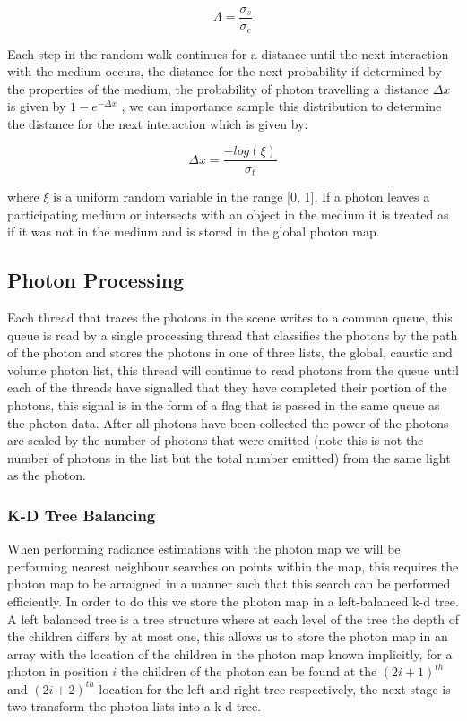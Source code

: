 \begin{equation}
\Lambda = \frac{\sigma_s}{\sigma_e}
\end{equation}

Each step in the random walk continues for a distance until the next interaction with the medium occurs, the distance for
the next probability if determined by the properties of the medium, the probability of photon travelling a distance $\Delta x$ is
given by $1 - e^{-\Delta x}$ \cite{wood-monte-carlo}, we can importance sample this distribution to determine the distance for
the next interaction \cite{JensenBook} which is given by:

\begin{equation}
\label{eq:volume_dist_importance}
\Delta x = \frac{-log(\xi)}{\sigma_t}
\end{equation}

where $\xi$ is a uniform random variable in the range [0, 1]. If a photon leaves a participating medium or intersects with an
object in the medium it is treated as if it was not in the medium and is stored in the global photon map.

\subsection{Photon Processing}
Each thread that traces the photons in the scene writes to a common queue, this queue is read by a single processing thread
that classifies the photons by the path of the photon and stores the photons in one of three lists, the global, caustic and
volume photon list, this thread will continue to read photons from the queue until each of the threads have signalled that they
have completed their portion of the photons, this signal is in the form of a flag that is passed in the same queue as the
photon data. After all photons have been collected the power of the photons are scaled by the number of photons that were
emitted (note this is not the number of photons in the list but the total number emitted) from the same light as the
photon.

\subsubsection{K-D Tree Balancing}
When performing radiance estimations with the photon map we will be performing nearest neighbour searches on points within
the map, this requires the photon map to be arraigned in a manner such that this search can be performed efficiently.
In order to do this we store the photon map in a left-balanced k-d tree. A left balanced tree is a tree structure where
at each level of the tree the depth of the children differs by at most one,
this allows us to store the photon map in an array with the location of the children in the photon map known implicitly,
for a photon in position $i$ the children of the photon can be found at the $(2i + 1)^{th}$ and $(2i + 2)^{th}$
location for the left and right tree respectively, the next stage is two transform the photon lists into a k-d tree.

